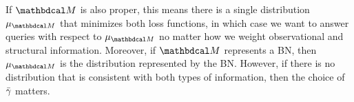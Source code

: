 %
%
%
\def\PrM{\mu_{\dg M}}%
If $\dg M$ is also proper,
    this means there is
    a single distribution $\PrM$
    that minimizes both loss functions, 
    in which case we want to answer queries with respect to $\PrM$
    no matter how we weight observational and structural information. 
Moreover, if $\dg M$ represents a BN,
then $\PrM$ is the distribution represented by the BN.  
However, if there is no distribution that is consistent with both types of information, then the choice of ${\bar\gamma}$ matters.  

